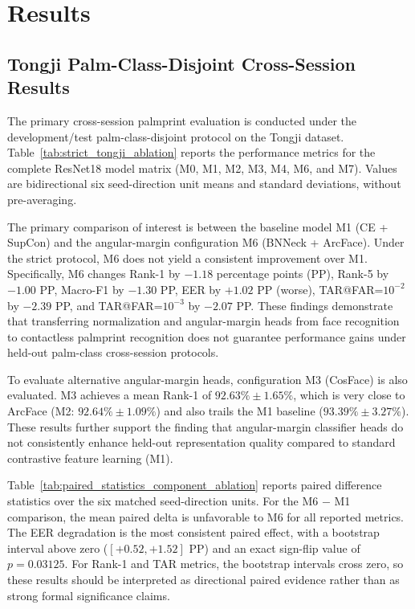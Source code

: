 \section{Results}
\label{sec:results}

\subsection{Tongji Palm-Class-Disjoint Cross-Session Results}

The primary cross-session palmprint evaluation is conducted under the development/test palm-class-disjoint protocol on the Tongji dataset. Table~\ref{tab:strict_tongji_ablation} reports the performance metrics for the complete ResNet18 model matrix (M0, M1, M2, M3, M4, M6, and M7). Values are bidirectional six seed-direction unit means and standard deviations, without pre-averaging.



The primary comparison of interest is between the baseline model M1 (CE + SupCon) and the angular-margin configuration M6 (BNNeck + ArcFace). Under the strict protocol, M6 does not yield a consistent improvement over M1. Specifically, M6 changes Rank-1 by $-1.18$ percentage points (PP), Rank-5 by $-1.00$ PP, Macro-F1 by $-1.30$ PP, EER by $+1.02$ PP (worse), TAR@FAR=$10^{-2}$ by $-2.39$ PP, and TAR@FAR=$10^{-3}$ by $-2.07$ PP. These findings demonstrate that transferring normalization and angular-margin heads from face recognition to contactless palmprint recognition does not guarantee performance gains under held-out palm-class cross-session protocols.

To evaluate alternative angular-margin heads, configuration M3 (CosFace) is also evaluated. M3 achieves a mean Rank-1 of $92.63\% \pm 1.65\%$, which is very close to ArcFace (M2: $92.64\% \pm 1.09\%$) and also trails the M1 baseline ($93.39\% \pm 3.27\%$). These results further support the finding that angular-margin classifier heads do not consistently enhance held-out representation quality compared to standard contrastive feature learning (M1).



Table~\ref{tab:paired_statistics_component_ablation} reports paired difference statistics over the six matched seed-direction units. For the M6 $-$ M1 comparison, the mean paired delta is unfavorable to M6 for all reported metrics. The EER degradation is the most consistent paired effect, with a bootstrap interval above zero ($[+0.52, +1.52]$ PP) and an exact sign-flip value of $p = 0.03125$. For Rank-1 and TAR metrics, the bootstrap intervals cross zero, so these results should be interpreted as directional paired evidence rather than as strong formal significance claims.

